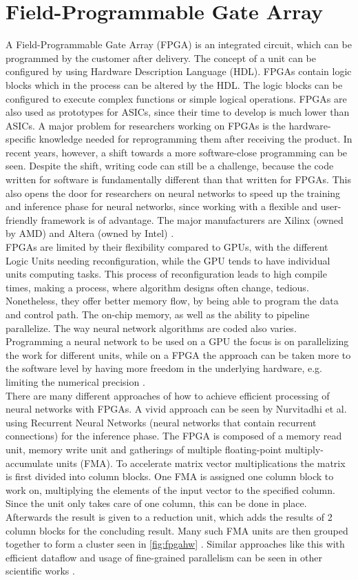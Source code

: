\documentclass[conference]{IEEEtran}
\begin{document}
	\section{Field-Programmable Gate Array}
	\label{section:foo}
	A Field-Programmable Gate Array (FPGA) is an integrated circuit, which can be programmed by the customer after delivery. The concept of a unit can be configured by using Hardware Description Language (HDL). FPGAs contain logic blocks which in the process can be altered by the HDL. The logic blocks can be configured to execute complex functions or simple logical operations. FPGAs are also used as prototypes for ASICs, since their time to develop is much lower than ASICs. A major problem for researchers working on FPGAs is the hardware-specific knowledge needed for reprogramming them after receiving the product. In recent years, however, a shift towards a more software-close programming can be seen. Despite the shift, writing code can still be a challenge, because the code written for software is fundamentally different than that written for FPGAs. This also opens the door for researchers on neural networks to speed up the training and inference phase for neural networks, since working with a flexible and user-friendly framework is of advantage. The major manufacturers are Xilinx (owned by AMD) and Altera (owned by Intel) \cite{majorfpga}.
	\\
	FPGAs are limited by their flexibility compared to GPUs, with the different Logic Units needing reconfiguration, while the GPU tends to have individual units computing tasks. This process of reconfiguration leads to high compile times, making a process, where algorithm designs often change, tedious. Nonetheless, they offer better memory flow, by being able to program the data and control path. The on-chip memory, as well as the ability to pipeline parallelize. The way neural network algorithms are coded also varies. Programming a neural network to be used on a GPU the focus is on parallelizing the work for different units, while on a FPGA the approach can be taken more to the software level by having more freedom in the underlying hardware, e.g. limiting the numerical precision \cite{gupta2015deep}.
	\\
	There are many different approaches of how to achieve efficient processing of neural networks with FPGAs. A vivid approach can be seen by Nurvitadhi et al. \cite{nurvitadhi2016accelerating} using Recurrent Neural Networks (neural networks that contain recurrent connections) for the inference phase. 
	The FPGA is composed of a memory read unit, memory write unit and gatherings of multiple floating-point multiply-accumulate units (FMA). To accelerate matrix vector multiplications the matrix is first divided into column blocks. One FMA is assigned one column block to work on, multiplying the elements of the input vector to the specified column. Since the unit only takes care of one column, this can be done in place. Afterwards the result is given to a reduction unit, which adds the results of 2 column blocks for the concluding result. Many such FMA units are then grouped together to form a cluster seen in \ref{fig:fpgahw} . Similar approaches like this with efficient dataflow and usage of fine-grained parallelism can be seen in other scientific works \cite{qiu2016going} \cite{wang2016dlau}.
\end{document}
